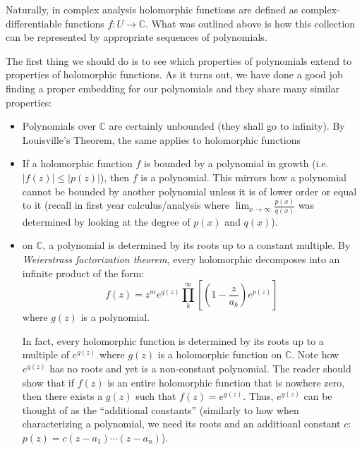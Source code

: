 \documentclass{article}
\newcommand{\C}{\mathbb{C}}
\newcommand{\CP}{\mathbb{C}\mathrm{P}}
\begin{document}
Naturally, in complex analysis holomorphic functions are defined as complex-differentiable functions $f: U \to
\C$. What was outlined above is how this collection can be represented by appropriate sequences of polynomials.

The first thing we should do is to see which properties of polynomials extend to properties of holomorphic
functions. As it turns out, we have done a good job finding a proper embedding for our polynomials and they
share many similar properties:
\begin{itemize}
  \item Polynomials over $\C$ are certainly unbounded (they shall go to infinity). By Louisville's Theorem, the
    same applies to holomorphic functions
  \item If a holomorphic function $f$ is bounded by a polynomial in growth (i.e. $|f(z)| \le |p(z)|$), then
    $f$ is a polynomial. This mirrors how a polynomial cannot be bounded by another polynomial unless it is of
    lower order or equal to it (recall in first year calculus/analysis where $\lim_{x \to \infty}
    \frac{p(x)}{q(x)}$ was determined by looking at the degree of $p(x)$ and $q(x)$).
  \item on $\C$, a polynomial is determined by its roots up to a constant multiple. By \emph{Weierstrass factorization
    theorem}, every holomorphic decomposes into an infinite product of the form:
    \[
      f(z) = z^me^{g(z)}\prod_k^{\infty} \left[\left(1 - \frac{z}{a_k}\right)e^{p(z)}\right]
    \]
    where $g(z)$ is a polynomial.

    In fact, every holomorphic function is determined by its roots up to a multiple of $e^{g(z)}$ where $g(z)$
    is a holomorphic function on $\C$. Note how $e^{g(z)}$ has no roots and yet is a non-constant polynomial.
    The reader should show that if $f(z)$ is an entire holomorphic function that is nowhere zero, then there
    exists a $g(z)$ such that $f(z) = e^{g(z)}$. Thus, $e^{g(z)}$ can be thought of as the ``additional
    constants'' (similarly to how when characterizing a polynomial, we need its roots and an additioanl
    constant $c$: $p(z) = c(z-a_1)\cdots(z-a_n)$).


\end{itemize}
\end{document}
